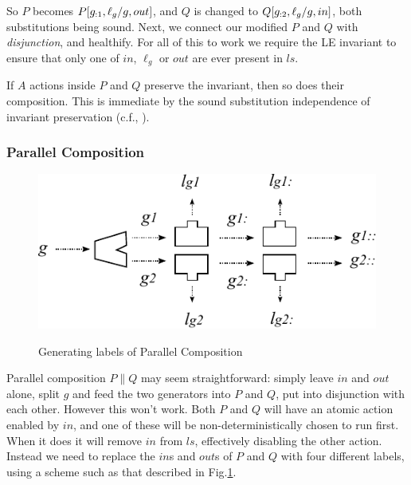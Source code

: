 So $P$ becomes $P[g_{:1},\ell_g/g,out]$,
and $Q$ is changed to $Q[g_{:2},\ell_g/g,in]$, both substitutions being sound.
Next, we connect our modified $P$ and $Q$ with \emph{disjunction},
and healthify.
For all of this to work we require the LE invariant
to ensure that only one of $in$, $\ell_g$ or $out$
are ever present in $ls$.


If $A$ actions inside $P$ and $Q$ preserve the invariant,
then so does their composition.
This is immediate by the sound substitution independence
of invariant preservation (c.f., ).



\newpage
\subsubsection{Parallel Composition}

\begin{figure}
  \centering
  \includegraphics{images/parallel-label-gen}\\
  \caption{Generating labels of Parallel Composition}
  \label{fig:par-lbl-gen}
\end{figure}
Parallel composition $P\parallel Q$ may seem straightforward:
simply leave $in$ and $out$ alone, split $g$ and feed the
two generators into $P$ and $Q$, put into disjunction with each other.
However this won't work. Both $P$ and $Q$ will
have an atomic action enabled by $in$,
and one of these will be non-deterministically chosen to run first.
When it does it will remove $in$ from $ls$,
effectively disabling the other action.
Instead we need to replace the $in$s and $out$s of $P$ and $Q$
with four different labels, using a scheme such as that described
in Fig.\ref{fig:par-lbl-gen}.

